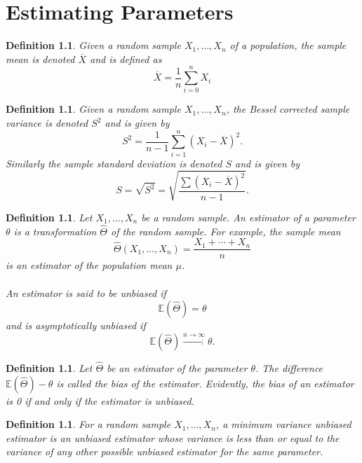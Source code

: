 \documentclass[1pt]{report}
\newtheorem{defn}[thm]{Definition}
\newcommand{\<}{\langle}
\renewcommand{\>}{\rangle}
\renewcommand{\bar}{\overline}
\newcommand{\E}{\mathbb{E}}
\begin{document}
\chapter{Estimating Parameters}
\begin{defn}\label{def:samplemean}
Given a random sample $X_1,\dots, X_n$ of a population, the \emph{sample mean} is denoted $\bar X$ and is defined as
$$\bar X = \dfrac{1}{n} \sum\limits_{i=0}^n X_i$$
\end{defn}
\begin{defn}\label{def:samplestandarddeviation}
Given a random sample $X_1, \dots, X_n$, the \emph{Bessel corrected sample variance} is denoted $S^2$ and is given by
$$S^2 = \dfrac{1}{n-1} \sum\limits_{i=1}^n (X_i - \bar X)^2.$$
Similarly the \emph{sample standard deviation} is denoted $S$ and is given by
$$S = \sqrt{S^2} = \sqrt{\dfrac{\sum (X_i - \bar X)^2}{n-1}}.$$
\end{defn}
\begin{defn}\label{def:estimator}
Let $X_1, \dots, X_n$ be a random sample. An \emph{estimator} of a parameter $\theta$ is a transformation $\hat \Theta$ of the random sample. For example, the sample mean
$$\hat \Theta(X_1,\dots, X_n) = \frac{X_1 + \cdots + X_n}{n}$$
is an estimator of the population mean $\mu$.\\
\\
An estimator is said to be \emph{unbiased} if 
$$\E(\hat\Theta) = \theta$$
and is \emph{asymptotically unbiased} if
$$\E(\hat\Theta) \xrightarrow{n\to \infty} \theta.$$
\end{defn}
\begin{defn}\label{def:estimatorbias}
Let $\hat\Theta$ be an estimator of the parameter $\theta$. The difference $\E(\hat\Theta) - \theta$ is called the \emph{bias} of the estimator. Evidently, the bias of an estimator is 0 if and only if the estimator is unbiased.
\end{defn}
\begin{defn}\label{def:mvue}
For a random sample $X_1, \dots, X_n$, a \emph{minimum variance unbiased estimator} is an unbiased estimator whose variance is less than or equal to the variance of any other possible unbiased estimator for the same parameter.
\end{defn}
\end{document}
